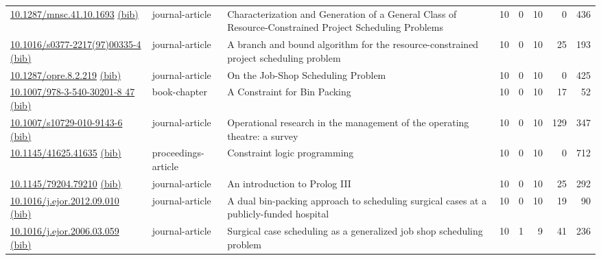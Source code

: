 {\begin{longtable}{p{5cm}lp{11cm}rrrrr}
\href{http://dx.doi.org/10.1287/mnsc.41.10.1693}{10.1287/mnsc.41.10.1693} \href{https://www.doi2bib.org/bib/10.1287/mnsc.41.10.1693}{(bib)} & journal-article & Characterization and Generation of a General Class of Resource-Constrained Project Scheduling Problems & 10 & 0 & 10 & 0 & 436 \\
\href{http://dx.doi.org/10.1016/s0377-2217(97)00335-4}{10.1016/s0377-2217(97)00335-4} \href{https://www.doi2bib.org/bib/10.1016/s0377-2217(97)00335-4}{(bib)} & journal-article & A branch and bound algorithm for the resource-constrained project scheduling problem & 10 & 0 & 10 & 25 & 193 \\
\href{http://dx.doi.org/10.1287/opre.8.2.219}{10.1287/opre.8.2.219} \href{https://www.doi2bib.org/bib/10.1287/opre.8.2.219}{(bib)} & journal-article & On the Job-Shop Scheduling Problem & 10 & 0 & 10 & 0 & 425 \\
\href{http://dx.doi.org/10.1007/978-3-540-30201-8_47}{10.1007/978-3-540-30201-8 47} \href{https://www.doi2bib.org/bib/10.1007/978-3-540-30201-8_47}{(bib)} & book-chapter & A Constraint for Bin Packing & 10 & 0 & 10 & 17 & 52 \\
\href{http://dx.doi.org/10.1007/s10729-010-9143-6}{10.1007/s10729-010-9143-6} \href{https://www.doi2bib.org/bib/10.1007/s10729-010-9143-6}{(bib)} & journal-article & Operational research in the management of the operating theatre: a survey & 10 & 0 & 10 & 129 & 347 \\
\href{http://dx.doi.org/10.1145/41625.41635}{10.1145/41625.41635} \href{https://www.doi2bib.org/bib/10.1145/41625.41635}{(bib)} & proceedings-article & Constraint logic programming & 10 & 0 & 10 & 0 & 712 \\
\href{http://dx.doi.org/10.1145/79204.79210}{10.1145/79204.79210} \href{https://www.doi2bib.org/bib/10.1145/79204.79210}{(bib)} & journal-article & An introduction to Prolog III & 10 & 0 & 10 & 25 & 292 \\
\href{http://dx.doi.org/10.1016/j.ejor.2012.09.010}{10.1016/j.ejor.2012.09.010} \href{https://www.doi2bib.org/bib/10.1016/j.ejor.2012.09.010}{(bib)} & journal-article & A dual bin-packing approach to scheduling surgical cases at a publicly-funded hospital & 10 & 0 & 10 & 19 & 90 \\
\href{http://dx.doi.org/10.1016/j.ejor.2006.03.059}{10.1016/j.ejor.2006.03.059} \href{https://www.doi2bib.org/bib/10.1016/j.ejor.2006.03.059}{(bib)} & journal-article & Surgical case scheduling as a generalized job shop scheduling problem & 10 & 1 & 9 & 41 & 236 \\

\end{longtable}}
